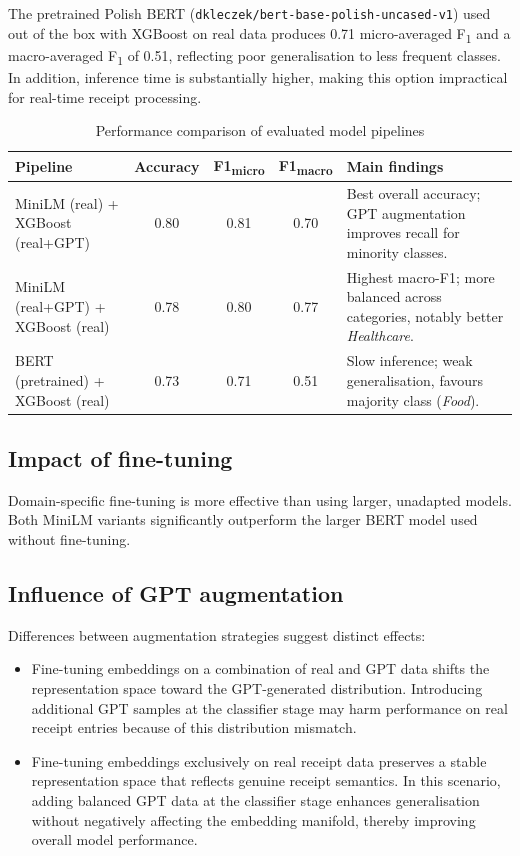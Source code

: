 \documentclass{SGGW-thesis-EN}
\begin{document}
The pretrained Polish BERT (\texttt{dkleczek/bert-base-polish-uncased-v1}) used out of the box with XGBoost on real
data produces 0.71 micro-averaged F\textsubscript{1} and a macro-averaged F\textsubscript{1} of 0.51, reflecting poor
generalisation to less frequent classes. In addition, inference time is substantially higher, making this option
impractical for real-time receipt processing.

\begin{table}[h]
  \centering
  \caption{Performance comparison of evaluated model pipelines}
  \label{tab:results_comparison}
  \begin{tabularx}{\textwidth}{p{4cm}cccX}
    \toprule
    \textbf{Pipeline} & \textbf{Accuracy} & \textbf{F1\textsubscript{micro}} & \textbf{F1\textsubscript{macro}} & \textbf{Main findings} \\
    \midrule
    MiniLM (real) + XGBoost (real+GPT) & 0.80 & 0.81 & 0.70 &
      Best overall accuracy; GPT augmentation improves recall for minority classes. \\
    MiniLM (real+GPT) + XGBoost (real) & 0.78 & 0.80 & 0.77 &
      Highest macro-F1; more balanced across categories, notably better \emph{Healthcare}. \\
    BERT (pretrained) + XGBoost (real) & 0.73 & 0.71 & 0.51 &
      Slow inference; weak generalisation, favours majority class (\emph{Food}). \\
    \bottomrule
  \end{tabularx}
\end{table}


\subsection{Impact of fine-tuning}
Domain-specific fine-tuning is more effective than using larger, unadapted models. Both MiniLM variants
significantly outperform the larger BERT model used without fine-tuning.

\subsection{Influence of GPT augmentation}
Differences between augmentation strategies suggest distinct effects:
\begin{itemize}
  \item Fine-tuning embeddings on a combination of real and GPT data shifts the representation space toward
        the GPT-generated distribution. Introducing additional GPT samples at the classifier stage may harm
        performance on real receipt entries because of this distribution mismatch.
  \item Fine-tuning embeddings exclusively on real receipt data preserves a stable representation space that
        reflects genuine receipt semantics. In this scenario, adding balanced GPT data at the classifier stage
        enhances generalisation without negatively affecting the embedding manifold, thereby improving overall
        model performance.
\end{itemize}
\end{document}
